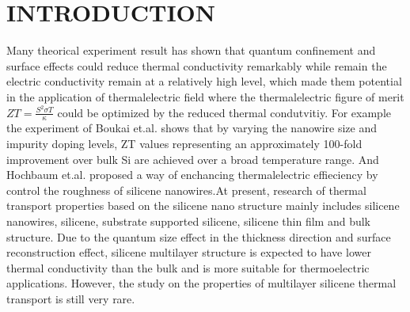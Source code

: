 \documentclass[%
 reprint,
 amsmath,amssymb,
 aps,
 prb,
]{revtex4-1}
\begin{document}
\section{INTRODUCTION}

Many theorical experiment result has shown that quantum confinement and surface effects could reduce thermal conductivity remarkably while remain the electric conductivity remain at a relatively high level, which made them potential in the application of thermalelectric field where the thermalelectric figure of merit $ZT=\frac{S^2 \sigma T}{\kappa}$ could be optimized by the reduced thermal condutvitiy. For example the experiment of Boukai et.al.\cite{Boukai2008} shows that by varying the nanowire size and impurity doping levels, ZT values representing an approximately 100-fold improvement over bulk Si are achieved over a broad temperature range. And Hochbaum et.al.\cite{Hochbaum2008} proposed a way of enchancing thermalelectric effieciency by control the roughness of silicene nanowires.At present, research of thermal transport properties based on the silicene nano structure mainly includes silicene nanowires\cite{Hochbaum2008,Yang2010,Shi2009,Boukai2008}, silicene\cite{Pei2013,Ng2013,Xie2014,Zhang2014,Liu2014}, substrate supported silicene\cite{Wang2015,Zhang2015a}, silicene thin film and bulk structure\cite{Bodapati2006,Tang2013Thermal,Jeong2012Thermal,Liu2006Thermal,Wang2006Lattice}. Due to the quantum size effect in the thickness direction and surface reconstruction effect, silicene multilayer structure is expected to have lower thermal conductivity than the bulk and is more suitable for thermoelectric applications. However, the study on the properties of multilayer silicene thermal transport is still very rare.
\end{document}
